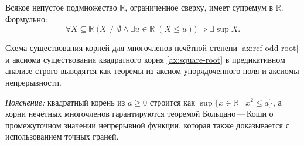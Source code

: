 \documentclass[11pt, a4paper]{extarticle}
\newcommand{\R}{{\mathbb R}}
\renewcommand{\le}{\leqslant}
\renewcommand{\ge}{\geqslant}
\begin{document}
\begin{axiom}
Всякое непустое подмножество $\R$, ограниченное сверху, имеет супремум в $\R$. Формульно:
\[
\forall X \subseteq \R\; \bigl( X \neq \emptyset \wedge \exists u \in \R\; (X \le u) \bigr) \Rightarrow \exists \sup X.
\]
\end{axiom}

\begin{theorem}
    Схема существования корней для многочленов нечётной степени \ref{ax:rcf-odd-root} и аксиома существования квадратного корня \ref{ax:square-root} в предикативном анализе строго выводятся как теоремы из аксиом упорядоченного поля и аксиомы непрерывности.
\end{theorem}

\noindent\textit{Пояснение:} квадратный корень из $a \ge 0$ строится как $\sup \{x \in \R \mid x^2 \le a\}$, а корни нечётных многочленов гарантируются теоремой Больцано\,---\,Коши о промежуточном значении непрерывной функции, которая также доказывается с использованием точных граней.
\end{document}
